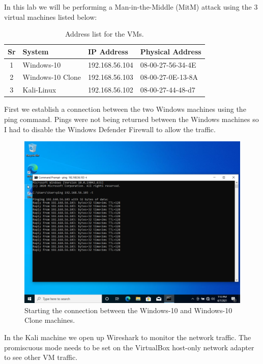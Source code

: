 In this lab we will be performing a Man-in-the-Middle (MitM) attack using the 3 virtual machines listed below:
\begin{table}[H]
    \centering\begin{tabular}{c l l l}
        \textbf{Sr} & \textbf{System} & \textbf{IP Address} & \textbf{Physical Address} \\
        \hline
        1 & Windows-10 & 192.168.56.104 & 08-00-27-56-34-4E\\
        2 & Windows-10 Clone & 192.168.56.103 & 08-00-27-0E-13-8A\\
        3 & Kali-Linux & 192.168.56.102 & 08-00-27-44-48-d7
    \end{tabular}
    \caption{Address list for the VMs.}
    \label{tab:address-list}
\end{table}

First we establish a connection between the two Windows machines using the ping command.
Pings were not being returned between the Windows machines so I had to disable the Windows Defender Firewall to allow the traffic.

\begin{figure}[H]
    \centering
    \includegraphics[width=\linewidth]{figures/ping-initial.png}
    \caption{Starting the connection between the Windows-10 and Windows-10 Clone machines.}
    \label{fig:ping-initial}
\end{figure}

In the Kali machine we open up Wireshark to monitor the network traffic.
The promiscuous mode needs to be set on the VirtualBox host-only network adapter to see other VM traffic.

